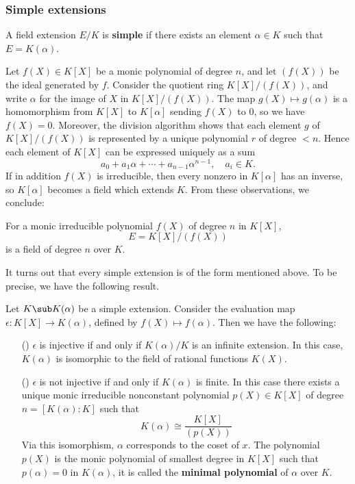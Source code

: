 \subsubsection{Simple extensions}
\begin{definition}
A field extension $E/K$ is \textbf{simple} if there exists an element $\alpha\in K$ such that $E=K(\alpha)$.
\end{definition}
Let $f(X)\in K[X]$ be a monic polynomial of degree $n$, and let $(f(X))$ be the ideal generated by $f$. Consider the quotient ring $K[X]/(f(X))$, and write $\alpha$ for the image of $X$ in $K[X]/(f(X))$. The map $g(X)\mapsto g(\alpha)$ is a homomorphism from $K[X]$ to $K[\alpha]$ sending $f(X)$ to $0$, so we have $f(X)=0$. Moreover, the division algorithm shows that each element $g$ of $K[X]/(f(X))$ is represented by a unique polynomial $r$ of degree $<n$. Hence each element of $K[X]$ can be expressed uniquely as a sum
\[a_0+a_1\alpha+\cdots+a_{n-1}\alpha^{n-1},\quad a_i\in K.\]
If in addition $f(X)$ is irreducible, then every nonzero in $K[\alpha]$ has an inverse, so $K[\alpha]$ becomes a field which extends $K$. From these observations, we conclude:
\begin{proposition}
For a monic irreducible polynomial $f(X)$ of degree $n$ in $K[X]$,
\[E=K[X]/(f(X))\]
is a field of degree $n$ over $K$.
\end{proposition}
It turns out that every simple extension is of the form mentioned above. To be precise, we have the following result.
\begin{proposition}\label{field simple ext char}
Let $K\sub K(\alpha)$ be a simple extension. Consider the evaluation map $\epsilon:K[X]\to K(\alpha)$, defined by $f(X)\mapsto f(\alpha)$. Then we have the following:
\begin{itemize}
\item[(\rmnum{1})] $\epsilon$ is injective if and only if $K(\alpha)/K$ is an infinite extension. In this case, $K(\alpha)$ is isomorphic to the field of rational functions $K(X)$.
\item[(\rmnum{2})] $\epsilon$ is not injective if and only if $K(\alpha)$ is finite. In this case there exists a unique monic irreducible nonconstant polynomial $p(X)\in K[X]$ of degree $n=[K(\alpha):K]$ such that
\[K(\alpha)\cong\dfrac{K[X]}{(p(X))}\]
Via this isomorphism, $\alpha$ corresponds to the coset of $x$. The polynomial $p(X)$ is the monic polynomial of smallest degree in $K[X]$ such that $p(\alpha)=0$ in $K(\alpha)$, it is called the \textbf{minimal polynomial} of $\alpha$ over $K$.
\end{itemize}
\end{proposition}
